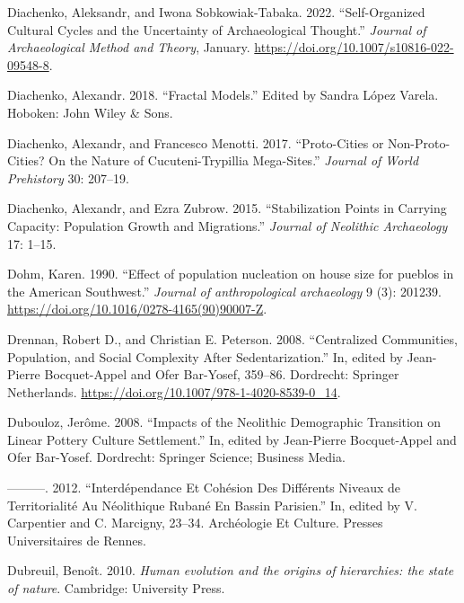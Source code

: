 \documentclass[
  12pt,
  a4paper, twoside]{book}
\newlength{\cslhangindent}
\newlength{\cslentryspacingunit} %
\newenvironment{CSLReferences}[2] %
 {%
  \setlength{\parindent}{0pt}
  \ifodd #1
  \let\oldpar\par
  \def\par{\hangindent=\cslhangindent\oldpar}
  \fi
  \setlength{\parskip}{#2\cslentryspacingunit}
 }%
 {}
\begin{document}
\begin{CSLReferences}{1}{0}
\leavevmode{}%
Diachenko, Aleksandr, and Iwona Sobkowiak-Tabaka. 2022. {``Self-{Organized Cultural Cycles} and the {Uncertainty} of {Archaeological Thought}.''} \emph{Journal of Archaeological Method and Theory}, January. \url{https://doi.org/10.1007/s10816-022-09548-8}.

\leavevmode{}%
Diachenko, Alexandr. 2018. {``Fractal Models.''} Edited by Sandra López Varela. Hoboken: John Wiley \& Sons.

\leavevmode{}%
Diachenko, Alexandr, and Francesco Menotti. 2017. {``Proto-Cities or Non-Proto-Cities? On the Nature of Cucuteni-Trypillia Mega-Sites.''} \emph{Journal of World Prehistory} 30: 207--19.

\leavevmode{}%
Diachenko, Alexandr, and Ezra Zubrow. 2015. {``Stabilization Points in Carrying Capacity: Population Growth and Migrations.''} \emph{Journal of Neolithic Archaeology} 17: 1--15.

\leavevmode{}%
Dohm, Karen. 1990. {``Effect of population nucleation on house size for pueblos in the American Southwest.''} \emph{Journal of anthropological archaeology} 9 (3): 201239. \url{https://doi.org/10.1016/0278-4165(90)90007-Z}.

\leavevmode{}%
Drennan, Robert D., and Christian E. Peterson. 2008. {``Centralized Communities, Population, and Social Complexity After Sedentarization.''} In, edited by Jean-Pierre Bocquet-Appel and Ofer Bar-Yosef, 359--86. Dordrecht: Springer Netherlands. \url{https://doi.org/10.1007/978-1-4020-8539-0_14}.

\leavevmode{}%
Dubouloz, Jerôme. 2008. {``Impacts of the Neolithic Demographic Transition on Linear Pottery Culture Settlement.''} In, edited by Jean-Pierre Bocquet-Appel and Ofer Bar-Yosef. Dordrecht: Springer Science; Business Media.

\leavevmode{}%
---------. 2012. {``Interdépendance Et Cohésion Des Différents Niveaux de Territorialité Au Néolithique Rubané En Bassin Parisien.''} In, edited by V. Carpentier and C. Marcigny, 23--34. Archéologie Et Culture. Presses Universitaires de Rennes.

\leavevmode{}%
Dubreuil, Benoît. 2010. \emph{Human evolution and the origins of hierarchies: the state of nature}. Cambridge: University Press.


\end{CSLReferences}
\end{document}
